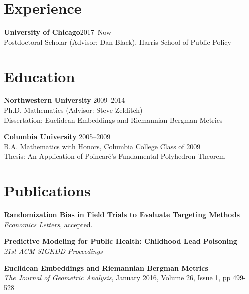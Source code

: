 \documentclass[margin,line]{resume}
\begin{document}
\address{epotash@uchicago.edu / \href{http://www.k2co3.net}{k2co3.net} / \href{https://github.com/potash}{github.com/potash}}
\begin{resume}
\section{\mysidestyle Experience}
	{\bf University of Chicago}\hfill{2017--Now}\\
	Postdoctoral Scholar (Advisor: Dan Black), Harris School of Public Policy

    \section{\mysidestyle Education}
	
	{\bf Northwestern University} \hfill {2009--2014} \\%
	Ph.D. Mathematics (Advisor: Steve Zelditch) \\
	Dissertation: Euclidean Embeddings and Riemannian Bergman Metrics

	{\bf Columbia University} \hfill {2005--2009} \\%
    B.A. Mathematics with Honors, Columbia College Class of 2009 \\
	Thesis: An Application of Poincar\'e's Fundamental Polyhedron Theorem

	
	\section{\mysidestyle Publications}
        {\bf Randomization Bias in Field Trials to Evaluate Targeting Methods}\\
        \textit{Economics Letters}, accepted.

	{\bf Predictive Modeling for Public Health: Childhood Lead Poisoning} \\
        \textit{21st ACM SIGKDD Proceedings}

	{\bf Euclidean Embeddings and Riemannian Bergman Metrics} \\
        \textit{The Journal of Geometric Analysis}, January 2016, Volume 26, Issue 1, pp 499-528


\end{resume}
\end{document}

